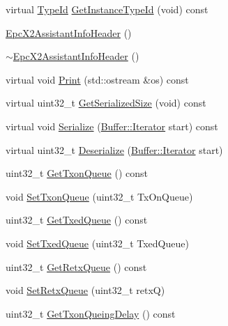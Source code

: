 \begin{DoxyCompactItemize}
\item 
virtual \hyperlink{classns3_1_1TypeId}{Type\+Id} \hyperlink{classns3_1_1EpcX2AssistantInfoHeader_ab5e79d3f76e39da89d031b1b0872af72}{Get\+Instance\+Type\+Id} (void) const 
\item 
\hyperlink{classns3_1_1EpcX2AssistantInfoHeader_ad19f4e04412c7ece73f1a54c5b6f5946}{Epc\+X2\+Assistant\+Info\+Header} ()
\item 
\hyperlink{classns3_1_1EpcX2AssistantInfoHeader_a69138a7e79cce6fa27fe308f54340670}{$\sim$\+Epc\+X2\+Assistant\+Info\+Header} ()
\item 
virtual void \hyperlink{classns3_1_1EpcX2AssistantInfoHeader_a9955f824491eef4ca0fd288553e79c18}{Print} (std\+::ostream \&os) const 
\item 
virtual uint32\+\_\+t \hyperlink{classns3_1_1EpcX2AssistantInfoHeader_a5364fe2f975eb8d258aea05dcdc1e5ca}{Get\+Serialized\+Size} (void) const 
\item 
virtual void \hyperlink{classns3_1_1EpcX2AssistantInfoHeader_a66d7efb6a1add6898ec8546b49c76250}{Serialize} (\hyperlink{classns3_1_1Buffer_1_1Iterator}{Buffer\+::\+Iterator} start) const 
\item 
virtual uint32\+\_\+t \hyperlink{classns3_1_1EpcX2AssistantInfoHeader_af56c3034b3963ab2c7bb7e0303761998}{Deserialize} (\hyperlink{classns3_1_1Buffer_1_1Iterator}{Buffer\+::\+Iterator} start)
\item 
uint32\+\_\+t \hyperlink{classns3_1_1EpcX2AssistantInfoHeader_a6e72efa1672145e84a5385bac3441ddf}{Get\+Txon\+Queue} () const 
\item 
void \hyperlink{classns3_1_1EpcX2AssistantInfoHeader_a5a69a4b32a64881442fd1699b1e732bd}{Set\+Txon\+Queue} (uint32\+\_\+t Tx\+On\+Queue)
\item 
uint32\+\_\+t \hyperlink{classns3_1_1EpcX2AssistantInfoHeader_a9d593d978fd3d7111107514d989d84fd}{Get\+Txed\+Queue} () const 
\item 
void \hyperlink{classns3_1_1EpcX2AssistantInfoHeader_aee14064aeeb2d12043e05e5ff5a1f13e}{Set\+Txed\+Queue} (uint32\+\_\+t Txed\+Queue)
\item 
uint32\+\_\+t \hyperlink{classns3_1_1EpcX2AssistantInfoHeader_a3c0f6d92faa3715e3af565d890e694af}{Get\+Retx\+Queue} () const 
\item 
void \hyperlink{classns3_1_1EpcX2AssistantInfoHeader_ae2183957209e8d34840d49cd21e1d495}{Set\+Retx\+Queue} (uint32\+\_\+t retxQ)
\item 
uint32\+\_\+t \hyperlink{classns3_1_1EpcX2AssistantInfoHeader_a4895d5a8d0be99188d2765ea06bd569c}{Get\+Txon\+Queing\+Delay} () const 

\end{DoxyCompactItemize}
